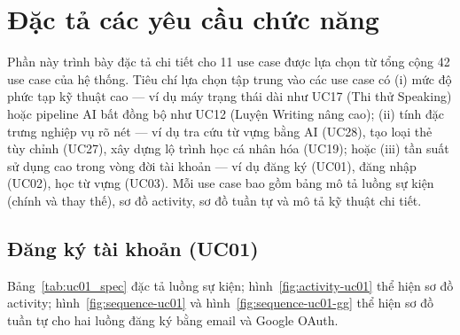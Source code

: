 \section{Đặc tả các yêu cầu chức năng}

Phần này trình bày đặc tả chi tiết cho 11 use case được lựa chọn từ tổng cộng 42 use case của hệ thống. Tiêu chí lựa chọn tập trung vào các use case có (i) mức độ phức tạp kỹ thuật cao --- ví dụ máy trạng thái dài như UC17 (Thi thử Speaking) hoặc pipeline AI bất đồng bộ như UC12 (Luyện Writing nâng cao); (ii) tính đặc trưng nghiệp vụ rõ nét --- ví dụ tra cứu từ vựng bằng AI (UC28), tạo loại thẻ tùy chỉnh (UC27), xây dựng lộ trình học cá nhân hóa (UC19); hoặc (iii) tần suất sử dụng cao trong vòng đời tài khoản --- ví dụ đăng ký (UC01), đăng nhập (UC02), học từ vựng (UC03). Mỗi use case bao gồm bảng mô tả luồng sự kiện (chính và thay thế), sơ đồ activity, sơ đồ tuần tự và mô tả kỹ thuật chi tiết.

\subsection{Đăng ký tài khoản (UC01)}
Bảng~\ref{tab:uc01_spec} đặc tả luồng sự kiện; hình~\ref{fig:activity-uc01} thể hiện sơ đồ activity; hình~\ref{fig:sequence-uc01} và hình~\ref{fig:sequence-uc01-gg} thể hiện sơ đồ tuần tự cho hai luồng đăng ký bằng email và Google OAuth.
